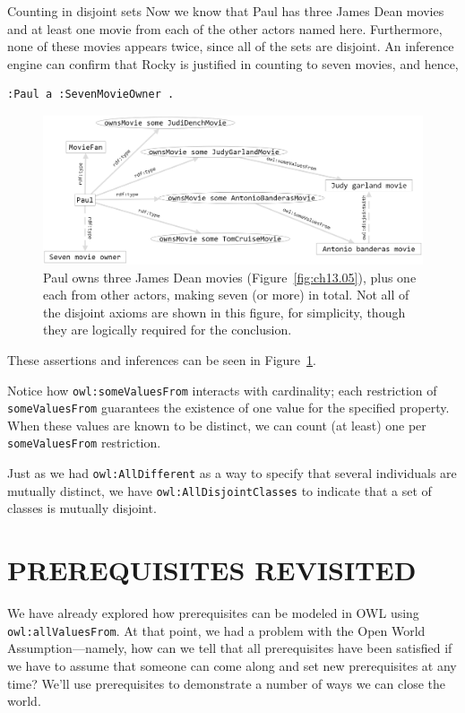 \begin{challenge}{Counting in disjoint sets}
Now we know that Paul has three James Dean movies and at least one movie
from each of the other actors named here. Furthermore, none of these
movies appears twice, since all of the sets are disjoint. An inference
engine can confirm that Rocky is justified in counting to seven movies,
and hence,

\begin{lstlisting}
:Paul a :SevenMovieOwner . 
\end{lstlisting}

\begin{figure}
\centering
\includegraphics[width=5in]{SWWOv3/media/ch13/figure13-6.png}
\caption{Paul owns three James Dean movies (Figure~\ref{fig:ch13.05}), plus one each from
other actors, making seven (or more) in total.  Not all of the disjoint axioms are shown in this figure, for simplicity, though they are logically required for the conclusion.}
\label{fig:ch13.06}
\end{figure}


These assertions and inferences can be seen in Figure~\ref{fig:ch13.06}.
\end{challenge}


Notice how \texttt{owl:someValuesFrom} interacts with cardinality; each
restriction of \texttt{someValuesFrom} guarantees the existence of one value for
the specified property. When these values are known to be distinct, we
can count (at least) one per \texttt{someValuesFrom} restriction.

Just as we had \texttt{owl:AllDifferent} as a way to specify that several
individuals are mutually distinct, we have \texttt{owl:AllDisjointClasses} to indicate that a set of classes is mutually 
disjoint.



\section{PREREQUISITES REVISITED}

We have already explored how prerequisites can be modeled in OWL using
\texttt{owl:allValuesFrom}. At that point, we had a problem with the Open World
Assumption---namely, how can we tell that all prerequisites have been
satisfied if we have to assume that someone can come along and set new
prerequisites at any time? We'll use prerequisites to demonstrate a
number of ways we can close the world.

